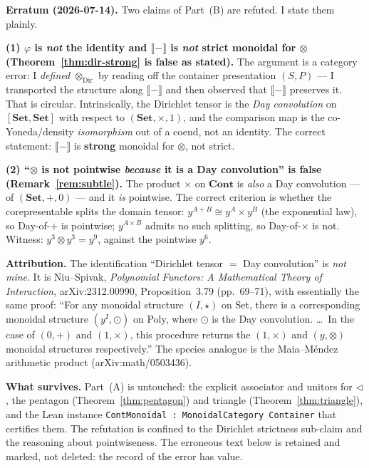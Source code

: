 \documentclass[11pt]{article}
\theoremstyle{definition}
\newcommand{\Set}{\mathbf{Set}}
\newcommand{\Cont}{\mathbf{Cont}}
\newcommand{\ext}[1]{\llbracket #1 \rrbracket}
\newcommand{\tri}{\mathbin{\triangleleft}}
\newcommand{\dir}{\mathbin{\otimes}}
\begin{document}
\begin{framed}
\noindent\textbf{Erratum (2026-07-14).} Two claims of Part~(B) are refuted. I
state them plainly.

\noindent\textbf{(1) $\varphi$ is \emph{not} the identity and $\ext{-}$ is
\emph{not} strict monoidal for $\dir$ (Theorem~\ref{thm:dir-strong} is false as
stated).} The argument is a category error: I \emph{defined}
$\dir_{\mathrm{Dir}}$ by reading off the container presentation $(S,P)$ --- I
transported the structure along $\ext{-}$ and then observed that $\ext{-}$
preserves it. That is circular. Intrinsically, the Dirichlet tensor is the
\emph{Day convolution} on $[\Set,\Set]$ with respect to $(\Set,\times,1)$, and
the comparison map is the co-Yoneda/density \emph{isomorphism} out of a coend,
not an identity. The correct statement: $\ext{-}$ is \textbf{strong} monoidal
for $\dir$, not strict.

\noindent\textbf{(2) ``$\dir$ is not pointwise \emph{because} it is a Day
convolution'' is false (Remark~\ref{rem:subtle}).} The product $\times$ on
$\Cont$ is \emph{also} a Day convolution --- of $(\Set,+,0)$ --- and it
\emph{is} pointwise. The correct criterion is whether the corepresentable
splits the domain tensor: $y^{A+B}\cong y^A\times y^B$ (the exponential law),
so Day-of-$+$ is pointwise; $y^{A\times B}$ admits no such splitting, so
Day-of-$\times$ is not. Witness: $y^3\dir y^3=y^9$, against the pointwise $y^6$.

\noindent\textbf{Attribution.} The identification ``Dirichlet tensor $=$ Day
convolution'' is \emph{not mine}. It is Niu--Spivak, \emph{Polynomial Functors:
A Mathematical Theory of Interaction}, arXiv:2312.00990, Proposition~3.79
(pp.~69--71), with essentially the same proof: ``For any monoidal structure
$(I,\star)$ on Set, there is a corresponding monoidal structure $(y^I,\odot)$
on Poly, where $\odot$ is the Day convolution. \dots\ In the case of $(0,+)$ and
$(1,\times)$, this procedure returns the $(1,\times)$ and $(y,\otimes)$
monoidal structures respectively.'' The species analogue is the Maia--M\'endez
arithmetic product (arXiv:math/0503436).

\noindent\textbf{What survives.} Part~(A) is untouched: the explicit associator
and unitors for $\tri$, the pentagon (Theorem~\ref{thm:pentagon}) and triangle
(Theorem~\ref{thm:triangle}), and the Lean instance
\texttt{ContMonoidal : MonoidalCategory Container} that certifies them. The
refutation is confined to the Dirichlet strictness sub-claim and the reasoning
about pointwiseness. The erroneous text below is retained and marked, not
deleted: the record of the error has value.
\end{framed}
\end{document}
